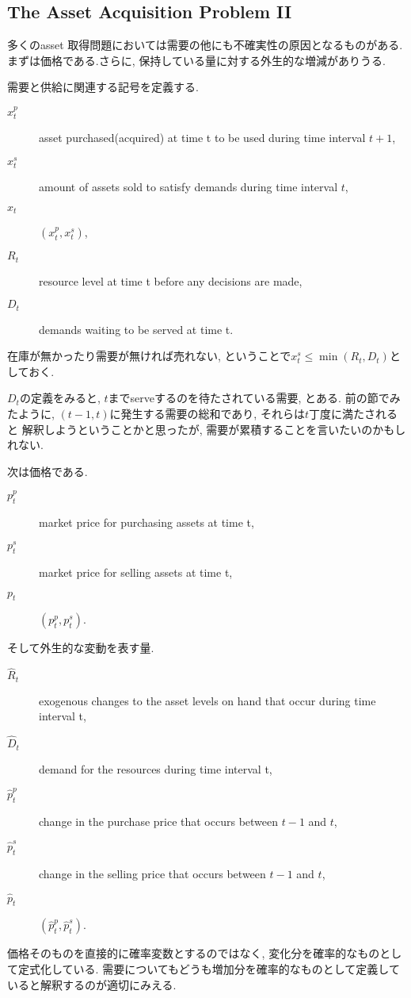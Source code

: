 \documentclass[11pt]{jsbook}
\begin{document}
\subsection{The Asset Acquisition Problem II}\label{2.2.6}
多くのasset 取得問題においては需要の他にも不確実性の原因となるものがある.
まずは価格である.さらに, 保持している量に対する外生的な増減がありうる.

需要と供給に関連する記号を定義する.
\begin{description}
	\item[$x_t^p$] asset purchased(acquired) at time t to be used during time interval $t+1$,
	\item[$x_t^s$] amount of assets sold to satisfy demands during time interval $t$,
	\item[$x_t$] $(x_t^p, x_t^s)$,
	\item[$R_t$] resource level at time t before any decisions are made,
	\item[$D_t$] demands waiting to be served at time t.	
\end{description}
在庫が無かったり需要が無ければ売れない, ということで$x_t^s \le \min (R_t, D_t) $としておく.

$D_t$の定義をみると, $t$までserveするのを待たされている需要, とある.
前の節でみたように, $(t-1, t)$に発生する需要の総和であり, それらは$t$丁度に満たされると
解釈しようということかと思ったが, 需要が累積することを言いたいのかもしれない.

次は価格である.
\begin{description}
	\item[$p_t^p$] market price for purchasing assets at time t,
	\item[$p_t^s$] market price for selling assets at time t,
	\item[$p_t$] $(p_t^p, p_t^s)$.
\end{description}

そして外生的な変動を表す量.
\begin{description}
	\item[$\hat{R}_t$] exogenous changes to the asset levels on hand that occur during time interval t,
	\item[$\hat{D}_t$] demand for the resources during time interval t,
	\item[$\hat{p}_t^p$] change in the purchase price that occurs between $t-1$ and $t$,
	\item[$\hat{p}_t^s$] change in the selling price that occurs between $t-1$ and $t$,
	\item[$\hat{p}_t$] $(\hat{p}_t^p, \hat{p}_t^s)$.
\end{description}
価格そのものを直接的に確率変数とするのではなく, 変化分を確率的なものとして定式化している.
需要についてもどうも増加分を確率的なものとして定義していると解釈するのが適切にみえる.
\end{document}
